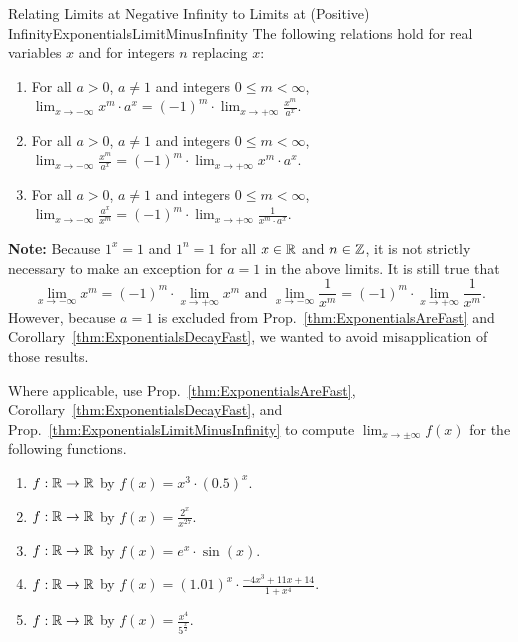 \bigskip

\begin{propColor}{Relating Limits at Negative Infinity to Limits at (Positive) Infinity}{ExponentialsLimitMinusInfinity}
The following relations hold for real variables $x$ and for integers $n$ replacing $x$: 
\begin{enumerate}
\renewcommand{\labelenumi}{(\alph{enumi})}
\setlength{\itemsep}{.2cm}
        \item For all $a > 0$, $a \neq 1$ and integers $0 \le m < \infty$, $\displaystyle{\lim_{x \to -\infty}} {x^m} \cdot {a^x} = (-1)^m  \cdot \displaystyle{\lim_{x \to +\infty}} \frac{x^m} {a^x}$.
      \item  For all $a > 0$, $a \neq 1$ and integers $0 \le m < \infty$, $\displaystyle{\lim_{x \to -\infty}} \frac{x^m} {a^x} = (-1)^m \cdot \displaystyle{\lim_{x \to +\infty}}  {x^m} \cdot {a^x}$.
      \item  For all $a > 0$, $a \neq 1$ and integers $0 \le m < \infty$, $\displaystyle{\lim_{x \to -\infty}} \frac{a^x}{x^m}  = (-1)^m \cdot \displaystyle{\lim_{x \to +\infty}}  \frac{1}{ {x^m} \cdot {a^x} }$.
\end{enumerate}

\bigskip

\textbf{Note:} Because $1^x = 1$ and $1^n=1$ for all $x\in \mathbb R$ and $n \in \mathbb Z$, it is not strictly necessary to make an exception for $a=1$ in the above limits. It is still true that
$$\displaystyle{\lim_{x \to -\infty}} {x^m} = (-1)^m  \cdot \displaystyle{\lim_{x \to +\infty}} {x^m} \text{ and } \displaystyle{\lim_{x \to -\infty}} \frac{1}{x^m}  = (-1)^m \cdot \displaystyle{\lim_{x \to +\infty}}  \frac{1}{ {x^m}  }.$$
However, because $a=1$ is excluded from  Prop.~\ref{thm:ExponentialsAreFast} and Corollary~\ref{thm:ExponentialsDecayFast}, we wanted to avoid misapplication of those results. 
\end{propColor}

\bigskip

\begin{example} 
\label{ex:EasyLimitsMixedExponentialRationalFunction}
Where applicable, use Prop.~\ref{thm:ExponentialsAreFast}, Corollary~\ref{thm:ExponentialsDecayFast}, and Prop.~\ref{thm:ExponentialsLimitMinusInfinity} to compute $\displaystyle \lim_{x \to \pm \infty} f(x)$ for the following functions. 

\begin{enumerate}
\renewcommand{\labelenumi}{(\alph{enumi})}
\setlength{\itemsep}{.2cm}
     \item  $f:\mathbb R \to \mathbb R$ by $f(x) = x^3 \cdot (0.5)^x$. 
        \item   $f:\mathbb R \to \mathbb R$ by $f(x) = \frac{2^x}{ x^{27} }$.
    \item  $f:\mathbb R \to \mathbb R$ by $f(x) = e^x \cdot \sin(x)$.
    \item  $f:\mathbb R \to \mathbb R$ by $f(x) = (1.01)^x \cdot \frac{-4x^3 + 11 x + 14}{1 + x^4}$.

        \item  $f:\mathbb R \to \mathbb R$ by $f(x) = \frac{x^4}{5^\frac{x}{2}}$.
\end{enumerate} 
    
\end{example}

